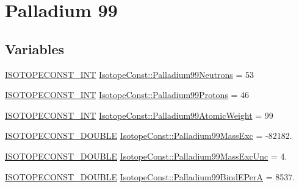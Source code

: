 \hypertarget{group___isotope_const-_palladium-_pd99}{}\section{Palladium 99}
\label{group___isotope_const-_palladium-_pd99}
\subsection*{Variables}
\begin{DoxyCompactItemize}
\item 
\mbox{\hyperlink{group___isotope_const-_macros_ga5f18360b3e99483a35c32d789e62621c}{I\+S\+O\+T\+O\+P\+E\+C\+O\+N\+S\+T\+\_\+\+I\+NT}} \mbox{\hyperlink{group___isotope_const-_palladium-_pd99_gaccdbcdffaf992834ca158a00006fa7eb}{Isotope\+Const\+::\+Palladium99\+Neutrons}} = 53
\item 
\mbox{\hyperlink{group___isotope_const-_macros_ga5f18360b3e99483a35c32d789e62621c}{I\+S\+O\+T\+O\+P\+E\+C\+O\+N\+S\+T\+\_\+\+I\+NT}} \mbox{\hyperlink{group___isotope_const-_palladium-_pd99_ga5039e00995a465c58344c27203d350c3}{Isotope\+Const\+::\+Palladium99\+Protons}} = 46
\item 
\mbox{\hyperlink{group___isotope_const-_macros_ga5f18360b3e99483a35c32d789e62621c}{I\+S\+O\+T\+O\+P\+E\+C\+O\+N\+S\+T\+\_\+\+I\+NT}} \mbox{\hyperlink{group___isotope_const-_palladium-_pd99_ga2cf2542bc89470ec3de3e2aa8e9082de}{Isotope\+Const\+::\+Palladium99\+Atomic\+Weight}} = 99
\item 
\mbox{\hyperlink{group___isotope_const-_macros_ga8f45a7272ce02c0b4c65c44636ed719a}{I\+S\+O\+T\+O\+P\+E\+C\+O\+N\+S\+T\+\_\+\+D\+O\+U\+B\+LE}} \mbox{\hyperlink{group___isotope_const-_palladium-_pd99_gaa2800a8818e5cddc60134bd83082d86b}{Isotope\+Const\+::\+Palladium99\+Mass\+Exc}} = -\/82182.
\item 
\mbox{\hyperlink{group___isotope_const-_macros_ga8f45a7272ce02c0b4c65c44636ed719a}{I\+S\+O\+T\+O\+P\+E\+C\+O\+N\+S\+T\+\_\+\+D\+O\+U\+B\+LE}} \mbox{\hyperlink{group___isotope_const-_palladium-_pd99_ga4144ee4ab48333cee0453e1dbeb2758b}{Isotope\+Const\+::\+Palladium99\+Mass\+Exc\+Unc}} = 4.
\item 
\mbox{\hyperlink{group___isotope_const-_macros_ga8f45a7272ce02c0b4c65c44636ed719a}{I\+S\+O\+T\+O\+P\+E\+C\+O\+N\+S\+T\+\_\+\+D\+O\+U\+B\+LE}} \mbox{\hyperlink{group___isotope_const-_palladium-_pd99_ga208e20ab12de26220f0c8dfcbb2e2a27}{Isotope\+Const\+::\+Palladium99\+Bind\+E\+PerA}} = 8537.
\item 

\end{DoxyCompactItemize}
